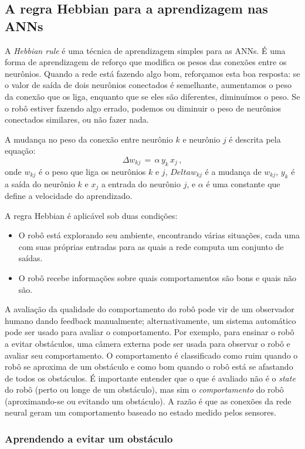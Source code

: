 \subsection{A regra Hebbian para a aprendizagem nas ANNs}\label{s.hebbian-rule}

A \emph{Hebbian rule} é uma técnica de aprendizagem simples para as ANNs. É uma forma de aprendizagem de reforço que modifica os pesos das conexões entre os neurônios. Quando a rede está fazendo algo bom, reforçamos esta boa resposta: se o valor de saída de dois neurônios conectados é semelhante, aumentamos o peso da conexão que os liga, enquanto que se eles são diferentes, diminuímos o peso. Se o robô estiver fazendo algo errado, podemos ou diminuir o peso de neurônios conectados similares, ou não fazer nada.

A mudança no peso da conexão entre neurônio $k$ e neurônio $j$ é descrita pela equação:
\[
\Delta w_{kj}\,=\,\alpha \, y_{k} \, x_{j}\,,\label{eq.hebbian}
\]
onde $w_{kj}$ é o peso que liga os neurônios $k$ e $j$, $Delta w_{kj}$ é a mudança de $w_{kj}$, $y_{k}$ é a saída do neurônio $k$ e $x_{j}$ a entrada do neurônio $j$, e $\alpha$ é uma constante que define a velocidade do aprendizado. 

A regra Hebbian é aplicável sob duas condições:
\begin{itemize}
\item O robô está explorando seu ambiente, encontrando várias situações, cada uma com suas próprias entradas para as quais a rede computa um conjunto de saídas.
\item O robô recebe informações sobre quais comportamentos são bons e quais não são.
\end{itemize}
A avaliação da qualidade do comportamento do robô pode vir de um observador humano dando feedback manualmente; alternativamente, um sistema automático pode ser usado para avaliar o comportamento. Por exemplo, para ensinar o robô a evitar obstáculos, uma câmera externa pode ser usada para observar o robô e avaliar seu comportamento. O comportamento é classificado como ruim quando o robô se aproxima de um obstáculo e como bom quando o robô está se afastando de todos os obstáculos. É importante entender que o que é avaliado não é o \emph{state} do robô (perto ou longe de um obstáculo), mas sim o \emph{comportamento} do robô (aproximando-se ou evitando um obstáculo). A razão é que as conexões da rede neural geram um comportamento baseado no estado medido pelos sensores.

\subsubsection*{Aprendendo a evitar um obstáculo}

